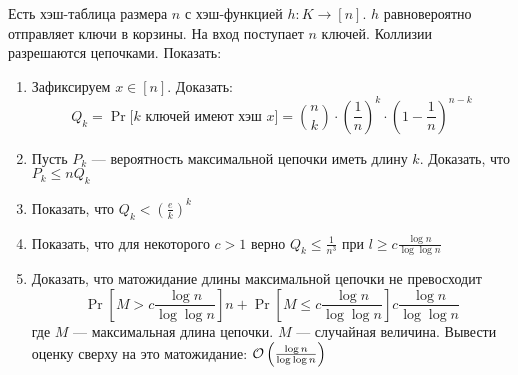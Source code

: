 \begin{task}[4]
Есть хэш-таблица размера $n$ с хэш-функцией $h: K \rightarrow [n]$. $h$ равновероятно отправляет ключи в корзины. На вход поступает $n$ ключей. Коллизии разрешаются цепочками. Показать:
\begin{enumerate}[label=(\alph*)]
	\item Зафиксируем $x \in [n]$. Доказать:
	\[ Q_k = \Pr\big[ \text{$k$ ключей имеют хэш $x$} \big] = {n \choose k} \cdot \left(\frac{1}{n}\right)^k \cdot \left(1 - \frac{1}{n}\right)^{n-k}\] 
	\item Пусть $P_k$ --- вероятность максимальной цепочки иметь длину $k$. Доказать, что $P_k \leqslant nQ_k$
	\item Показать, что $Q_k < (\frac{e}{k})^k$
	\item Показать, что для некоторого $c > 1$ верно $Q_k \leqslant \frac{1}{n^3}$ при $l \geqslant c \frac{\log{n}}{\log{\log{n}}}$
	\item Доказать, что матожидание длины максимальной цепочки не превосходит
	\[ \Pr\left[ M > c \frac{\log{n}}{\log{\log{n}}} \right]n + \Pr\left[ M \leqslant c \frac{\log{n}}{\log{\log{n}}} \right]c \frac{\log{n}}{\log{\log{n}}} \]
	где $M$ --- максимальная длина цепочки. $M$ --- случайная величина. Вывести оценку сверху на это матожидание: $\mathcal{O}\left(\frac{\log{n}}{\log{\log{n}}}\right)$
\end{enumerate}
\end{task}
